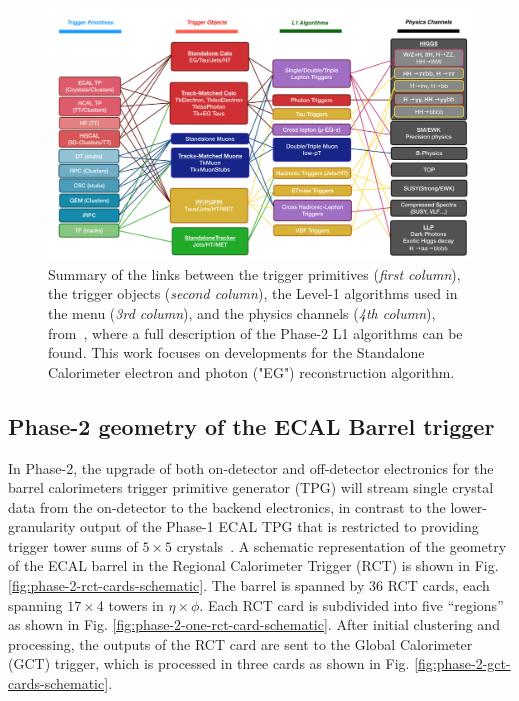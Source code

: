 \begin{figure}[ht]
    \centering
    \includegraphics[width=15cm]{figures/ch-3-phase2/phase-2-summary-trigger-TP-algo-physics.png}
    \caption[Summary of the links between the trigger primitives, the trigger objects, the Level-1 algorithms, and the physics channels in the Phase-2 menu.]{Summary of the links between the trigger primitives (\textit{first column}), the trigger objects (\textit{second column}), the Level-1 algorithms used in the menu (\textit{3rd column}), and the physics channels (\textit{4th column}), from~\cite{CMS-TDR-021}, where a full description of the Phase-2 L1 algorithms can be found. This work focuses on developments for the Standalone Calorimeter electron and photon ("EG") reconstruction algorithm.}
    \label{fig:phase-2-summary-trigger-TP-algo-physics}
\end{figure}

\subsection{Phase-2 geometry of the ECAL Barrel trigger}
\label{section:phase-2-ECAL-barrel-geometry}
In Phase-2, the upgrade of both on-detector and off-detector electronics for the barrel calorimeters trigger primitive generator (TPG) will stream single crystal data from the on-detector to the backend electronics, in contrast to the lower-granularity output of the Phase-1 ECAL TPG that is restricted to providing trigger tower sums of $5 \times 5$ crystals~\cite{CMS-TDR-021}. 
A schematic representation of the geometry of the ECAL barrel in the Regional Calorimeter Trigger (RCT) is shown in Fig. \ref{fig:phase-2-rct-cards-schematic}. The barrel is spanned by 36 RCT cards, each spanning $17 \times 4$ towers in $\eta \times \phi$. Each RCT card is subdivided into five ``regions'' as shown in Fig. \ref{fig:phase-2-one-rct-card-schematic}. After initial clustering and processing, the outputs of the RCT card are sent to the Global Calorimeter (GCT) trigger, which is processed in three cards as shown in Fig. \ref{fig:phase-2-gct-cards-schematic}.

